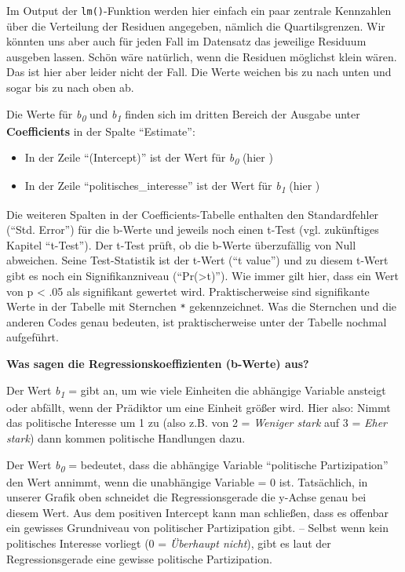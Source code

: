 \documentclass[
]{book}
\providecommand{\tightlist}{%
  \setlength{\itemsep}{0pt}\setlength{\parskip}{0pt}}
\begin{document}
Im Output der \texttt{lm()}-Funktion werden hier einfach ein paar zentrale Kennzahlen über die Verteilung der Residuen angegeben, nämlich die Quartilsgrenzen. Wir könnten uns aber auch für jeden Fall im Datensatz das jeweilige Residuum ausgeben lassen. Schön wäre natürlich, wenn die Residuen möglichst klein wären. Das ist hier aber leider nicht der Fall. Die Werte weichen bis zu  nach unten und sogar bis zu  nach oben ab.

Die Werte für \emph{b\textsubscript{0}} und \emph{b\textsubscript{1}} finden sich im dritten Bereich der Ausgabe unter \textbf{Coefficients} in der Spalte ``Estimate'':

\begin{itemize}
\tightlist
\item
  In der Zeile ``(Intercept)'' ist der Wert für \emph{b\textsubscript{0}} (hier )
\item
  In der Zeile ``politisches\_interesse'' ist der Wert für \emph{b\textsubscript{1}} (hier )
\end{itemize}

Die weiteren Spalten in der Coefficients-Tabelle enthalten den Standardfehler (``Std. Error'') für die b-Werte und jeweils noch einen t-Test (vgl. zukünftiges Kapitel ``t-Test''). Der t-Test prüft, ob die b-Werte überzufällig von Null abweichen. Seine Test-Statistik ist der t-Wert (``t value'') und zu diesem t-Wert gibt es noch ein Signifikanzniveau (``Pr(\textgreater\textbar t\textbar)''). Wie immer gilt hier, dass ein Wert von p \textless{} .05 als signifikant gewertet wird. Praktischerweise sind signifikante Werte in der Tabelle mit Sternchen \texttt{*} gekennzeichnet. Was die Sternchen und die anderen Codes genau bedeuten, ist praktischerweise unter der Tabelle nochmal aufgeführt.

\leavevmode\hypertarget{info_b}{}%
\textbf{Was sagen die Regressionskoeffizienten (b-Werte) aus?}

Der Wert \emph{b\textsubscript{1}} =  gibt an, um wie viele Einheiten die abhängige Variable ansteigt oder abfällt, wenn der Prädiktor um eine Einheit größer wird. Hier also: Nimmt das politische Interesse um 1 zu (also z.B. von 2 = \emph{Weniger stark} auf 3 = \emph{Eher stark}) dann kommen  politische Handlungen dazu.

Der Wert \emph{b\textsubscript{0}} =  bedeutet, dass die abhängige Variable ``politische Partizipation'' den Wert  annimmt, wenn die unabhängige Variable = 0 ist. Tatsächlich, in unserer Grafik oben schneidet die Regressionsgerade die y-Achse genau bei diesem Wert. Aus dem positiven Intercept kann man schließen, dass es offenbar ein gewisses Grundniveau von politischer Partizipation gibt. -- Selbst wenn kein politisches Interesse vorliegt (0 = \emph{Überhaupt nicht}), gibt es laut der Regressionsgerade eine gewisse politische Partizipation.
\end{document}
